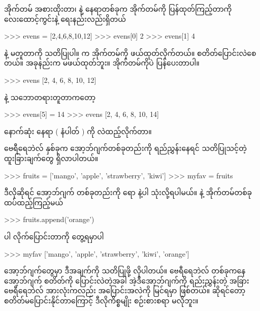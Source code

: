 အိုက်တမ် အစားထိုးတာ၊  နဲ့ နေရာတစ်ခုက အိုက်တမ်ကို ပြန်ထုတ်ကြည့်တာကို လေးထောင့်ကွင်းနဲ့ ရေးနည်းလည်းရှိတယ်
\begin{codetxt}
>>> evens = [2,4,6,8,10,12]
>>> evens[0]
2
>>> evens[1]
4
\end{codetxt}
 နဲ့ မတူတာကို သတိပြုပါ။  က အိုက်တမ်ကို ဖယ်ထုတ်လိုက်တယ်။ စတိတ်ပြောင်းလဲစေတယ်။ အခုနည်းက မဖယ်ထုတ်ဘူး။ အိုက်တမ်ကိုပဲ ပြန်ပေးတာပါ။
\begin{codetxt}
>>> evens
[2, 4, 6, 8, 10, 12]
\end{codetxt}
 နဲ့ သဘောတရားတူတာကတော့ 
\begin{codetxt}
>>> evens[5] = 14
>>> evens
[2, 4, 6, 8, 10, 14]
\end{codetxt}
နောက်ဆုံး နေရာ ( နံပါတ် ) ကို  လဲထည့်လိုက်တာ။

ဗေရီရေဘဲလ် နှစ်ခုက အော့ဘ်ဂျက်တစ်ခုတည်းကို ရည်ညွှန်းနေရင် သတိပြုသင့်တဲ့ ထူးခြားချက်တွေ ရှိလာပါတယ်။ 
\begin{codetxt}
>>> fruits = ['mango', 'apple', 'strawberry', 'kiwi']
>>> myfav = fruits
\end{codetxt}
ဒီလိုဆိုရင် အော့ဘ်ဂျက် တစ်ခုတည်းကို  ရော  နဲ့ပါ သုံးလို့ရပါမယ်။  နဲ့ အိုက်တမ်တစ်ခု ထပ်ထည့်ကြည့်မယ်
\begin{codetxt}
>>> fruits.append('orange')
\end{codetxt}
 ပါ လိုက်ပြောင်းတာကို တွေ့ရမှာပါ
\begin{codetxt}
>>> myfav
['mango', 'apple', 'strawberry', 'kiwi', 'orange']
\end{codetxt}
 အော့ဘ်ဂျက်တွေမှာ ဒီအချက်ကို သတိပြုဖို့ လိုပါတယ်။ ဗေရီရေဘဲလ် တစ်ခုကနေ အော့ဘ်ဂျက် စတိတ်ကို ပြောင်းလဲတဲ့အခါ အဲ့ဒီအော့ဘ်ဂျက်ကို ရည်းညွှန်းတဲ့ အခြား ဗေရီရေဘဲလ် အားလုံးကလည်း အပြောင်းအလဲကို မြင်ရမှာ ဖြစ်တယ်။  ဆိုရင်တော့  စတိတ်မပြောင်းနိုင်တာကြောင့် ဒီလိုကိစ္စမျိုး စဉ်းစားစရာ မလိုဘူး။












\afterpage{\blankpage}